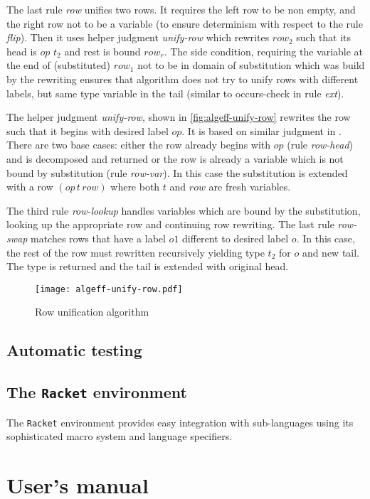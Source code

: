 \documentclass[inz, english, shortabstract]{iithesis}
\newcommand{\Racket}{\texttt{Racket}}
\begin{document}
The last rule \emph{row} unifies two rows.
It requires the left row to be non empty, and the right row not to be a variable (to ensure determinism with respect to the rule \emph{flip}).
Then it uses helper judgment \emph{unify-row} which rewrites $row_2$ such that its head is $op \, \, t_2$ and rest is bound $row_r$.
The side condition, requiring the variable at the end of (substituted) $row_1$ not to be in domain of substitution which was build by the rewriting ensures that algorithm does not try to unify rows with different labels, but same type variable in the tail (similar to occurs-check in rule \emph{ext}).

The helper judgment \emph{unify-row}, shown in \autoref{fig:algeff-unify-row} rewrites the row such that it begins with desired label $op$.
It is based on similar judgment in \cite{Leijen2005}.
There are two base cases: either the row already begins with $op$ (rule \emph{row-head}) and is decomposed and returned or the row is already a variable which is not bound by substitution (rule \emph{row-var}).
In this case the substitution is extended with a row $(op \, t \, row)$ where both $t$ and $row$ are fresh variables.

The third rule \emph{row-lookup} handles variables which are bound by the substitution, looking up the appropriate row and continuing row rewriting.
The last rule \emph{row-swap} matches rows that have a label $o1$ different to desired label $o$.
In this case, the rest of the row must rewritten recursively yielding type $t_2$ for $o$ and new tail.
The type is returned and the tail is extended with original head.

\begin{figure}
  \centering
  \texttt{[image: algeff-unify-row.pdf]}
  \caption{Row unification algorithm}
  \label{fig:algeff-unify-row}
\end{figure}

\section{Automatic testing}

\section{The \Racket{} environment}
The \Racket{} environment provides easy integration with sub-languages using its sophisticated macro system and language specifiers.


\chapter{User's manual}\label{ch:manual}

\printbibliography

\end{document}
